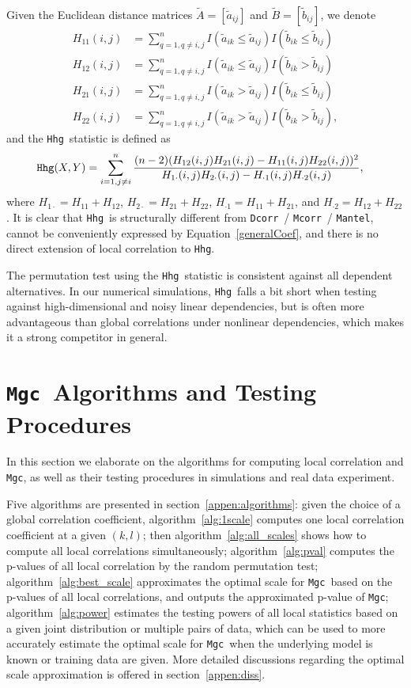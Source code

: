 \documentclass[11pt]{article}
\providecommand{\sct}[1]{{\sc \texttt{#1}}}
\newcommand{\Mgc}{\sct{Mgc}}
\newcommand{\Hhg}{\sct{Hhg}}
\newcommand{\Dcorr}{\sct{Dcorr}}
\newcommand{\Mcorr}{\sct{Mcorr}}
\newcommand{\Mantel}{\sct{Mantel}}
\begin{document}
Given the Euclidean distance matrices $\tilde{A}=[\tilde{a}_{ij}]$ and $\tilde{B}=[\tilde{b}_{ij}]$, we denote
\begin{align*}
H_{11}(i,j) &= \sum_{q=1,q\neq i,j}^{n}I(\tilde{a}_{ik} \leq \tilde{a}_{ij})I(\tilde{b}_{ik} \leq \tilde{b}_{ij}) \\
H_{12}(i,j) &= \sum_{q=1,q\neq i,j}^{n}I(\tilde{a}_{ik} \leq \tilde{a}_{ij})I(\tilde{b}_{ik} > \tilde{b}_{ij}) \\
H_{21}(i,j) &= \sum_{q=1,q\neq i,j}^{n}I(\tilde{a}_{ik} > \tilde{a}_{ij})I(\tilde{b}_{ik} \leq \tilde{b}_{ij}) \\
H_{22}(i,j) &= \sum_{q=1,q\neq i,j}^{n}I(\tilde{a}_{ik} > \tilde{a}_{ij})I(\tilde{b}_{ik} > \tilde{b}_{ij}),
\end{align*}
and the \Hhg~statistic is defined as
\begin{align*}
\Hhg(X,Y) &= \sum_{i=1,j\neq i}^{n} \frac{(n-2)(H_{12}(i,j)H_{21}(i,j)-H_{11}(i,j)H_{22}(i,j))^2}{H_{1 \cdot}(i,j)H_{2 \cdot}(i,j)-H_{\cdot 1}(i,j)H_{\cdot 2}(i,j)},
\end{align*}
where $H_{1 \cdot}=H_{11}+H_{12}$, $H_{2 \cdot}=H_{21}+H_{22}$, $H_{\cdot 1}=H_{11}+H_{21}$, and $H_{\cdot 2}=H_{12}+H_{22}$. It is clear that \Hhg~is structurally different from \Dcorr~/ \Mcorr~/ \Mantel, cannot be conveniently expressed by Equation~\ref{generalCoef}, and there is no direct extension of local correlation to \Hhg.

The permutation test using the \Hhg~statistic is consistent against all dependent alternatives. In our numerical simulations, \Hhg~falls a bit short when testing against high-dimensional and noisy linear dependencies, but is often more advantageous than global correlations under nonlinear dependencies, which makes it a strong competitor in general.

\section{\Mgc~Algorithms and Testing Procedures}
\label{appen:tests}
In this section we elaborate on the algorithms for computing local correlation and \Mgc, as well as their testing procedures in simulations and real data experiment.

Five algorithms are presented in section~\ref{appen:algorithms}: given the choice of a global correlation coefficient, algorithm~\ref{alg:1scale} computes one local correlation coefficient at a given $(k,l)$; then algorithm~\ref{alg:all_scales} shows how to compute all local correlations simultaneously; algorithm~\ref{alg:pval} computes the p-values of all local correlation by the random permutation test; algorithm~\ref{alg:best_scale} approximates the optimal scale for \Mgc~based on the p-values of all local correlations, and outputs the approximated p-value of \Mgc; algorithm~\ref{alg:power} estimates the testing powers of all local statistics based on a given joint distribution or multiple pairs of data, which can be used to more accurately estimate the optimal scale for \Mgc~when the underlying model is known or training data are given. More detailed discussions regarding the optimal scale approximation is offered in section~\ref{appen:diss}.
\end{document}
